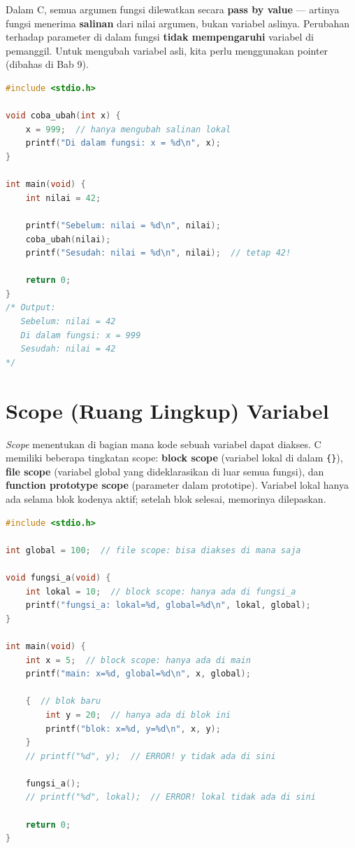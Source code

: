 \documentclass[../main.tex]{subfiles}
\begin{document}
Dalam C, semua argumen fungsi dilewatkan secara \textbf{pass by value} --- artinya fungsi menerima \textbf{salinan} dari nilai argumen, bukan variabel aslinya. Perubahan terhadap parameter di dalam fungsi \textbf{tidak mempengaruhi} variabel di pemanggil. Untuk mengubah variabel asli, kita perlu menggunakan pointer (dibahas di Bab 9).

\begin{lstlisting}[language=C,caption=Demonstrasi pass by value]
#include <stdio.h>

void coba_ubah(int x) {
    x = 999;  // hanya mengubah salinan lokal
    printf("Di dalam fungsi: x = %d\n", x);
}

int main(void) {
    int nilai = 42;
    
    printf("Sebelum: nilai = %d\n", nilai);
    coba_ubah(nilai);
    printf("Sesudah: nilai = %d\n", nilai);  // tetap 42!
    
    return 0;
}
/* Output:
   Sebelum: nilai = 42
   Di dalam fungsi: x = 999
   Sesudah: nilai = 42
*/
\end{lstlisting}

\section{Scope (Ruang Lingkup) Variabel}

\textit{Scope} menentukan di bagian mana kode sebuah variabel dapat diakses. C memiliki beberapa tingkatan scope: \textbf{block scope} (variabel lokal di dalam \texttt{\{\}}), \textbf{file scope} (variabel global yang dideklarasikan di luar semua fungsi), dan \textbf{function prototype scope} (parameter dalam prototipe). Variabel lokal hanya ada selama blok kodenya aktif; setelah blok selesai, memorinya dilepaskan.

\begin{lstlisting}[language=C,caption=Demonstrasi scope variabel]
#include <stdio.h>

int global = 100;  // file scope: bisa diakses di mana saja

void fungsi_a(void) {
    int lokal = 10;  // block scope: hanya ada di fungsi_a
    printf("fungsi_a: lokal=%d, global=%d\n", lokal, global);
}

int main(void) {
    int x = 5;  // block scope: hanya ada di main
    printf("main: x=%d, global=%d\n", x, global);
    
    {  // blok baru
        int y = 20;  // hanya ada di blok ini
        printf("blok: x=%d, y=%d\n", x, y);
    }
    // printf("%d", y);  // ERROR! y tidak ada di sini
    
    fungsi_a();
    // printf("%d", lokal);  // ERROR! lokal tidak ada di sini
    
    return 0;
}
\end{lstlisting}
\end{document}
